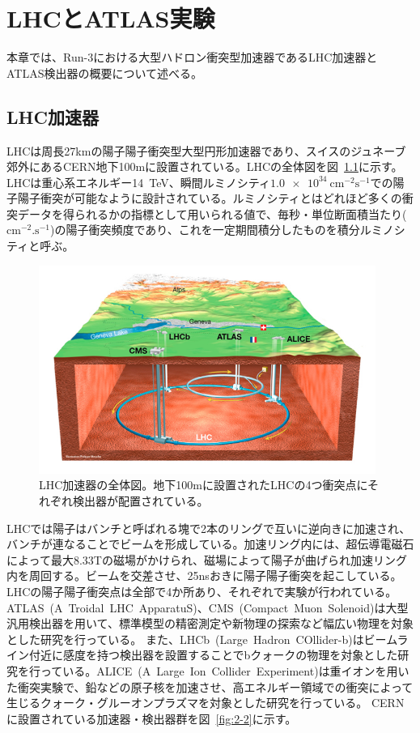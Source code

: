 \chapter{LHCとATLAS実験}\label{chapter2}
本章では、Run-3における大型ハドロン衝突型加速器であるLHC加速器とATLAS検出器の概要について述べる。


\section{LHC加速器}\label{section2-1}
LHCは周長27kmの陽子陽子衝突型大型円形加速器であり、スイスのジュネーブ郊外にあるCERN地下100mに設置されている。LHCの全体図を図~\ref{fig:2-1}に示す。LHCは重心系エネルギー\SI{14}{\tera \electronvolt}、瞬間ルミノシティ$\SI{1.0e34}{\cm^{-2}\s^{-1}}$での陽子陽子衝突が可能なように設計されている。ルミノシティとはどれほど多くの衝突データを得られるかの指標として用いられる値で、毎秒・単位断面積当たり($\si{\cm^{-2}.\s^{-1}}$)の陽子衝突頻度であり、これを一定期間積分したものを積分ルミノシティと呼ぶ。

\begin{figure}[h]
  \centering
  \includegraphics[clip, width=11cm]{fig/2/lhc_map.jpg}
  \caption{LHC加速器の全体図\cite{article:Overall_view_LHC}。地下100mに設置されたLHCの4つ衝突点にそれぞれ検出器が配置されている。}
  \label{fig:2-1}
\end{figure}

LHCでは陽子はバンチと呼ばれる塊で2本のリングで互いに逆向きに加速され、バンチが連なることでビームを形成している。加速リング内には、超伝導電磁石によって最大8.33Tの磁場がかけられ、磁場によって陽子が曲げられ加速リング内を周回する。ビームを交差させ、25nsおきに陽子陽子衝突を起こしている。
LHCの陽子陽子衝突点は全部で4か所あり、それぞれで実験が行われている。
ATLAS~(A~Troidal~LHC~ApparatuS)、CMS~(Compact~Muon~Solenoid)\cite{article:CMSExperiment}は大型汎用検出器を用いて、標準模型の精密測定や新物理の探索など幅広い物理を対象とした研究を行っている。
また、LHCb~(Large~Hadron~COllider-b)\cite{article:LHCbExperiment}はビームライン付近に感度を持つ検出器を設置することでbクォークの物理を対象とした研究を行っている。ALICE~(A~Large~Ion~Collider~Experiment)\cite{article:ALICEExperiment}は重イオンを用いた衝突実験で、鉛などの原子核を加速させ、高エネルギー領域での衝突によって生じるクォーク・グルーオンプラズマを対象とした研究を行っている。
CERNに設置されている加速器・検出器群を図~\ref{fig:2-2}に示す。

